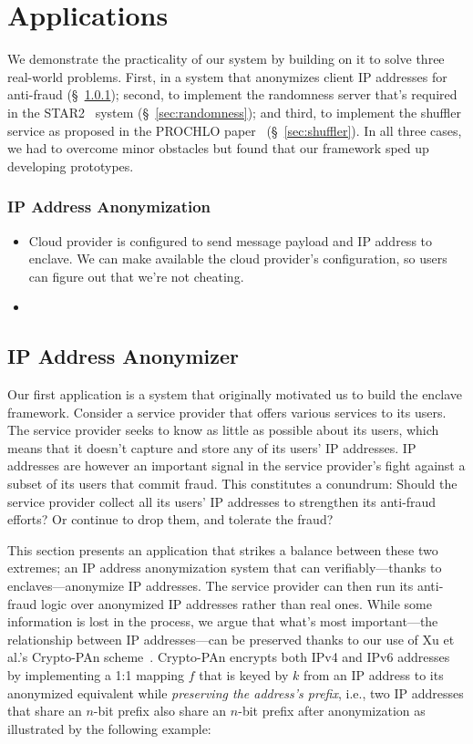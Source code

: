 \section{Applications}
\label{sec:applications}

We demonstrate the practicality of our system by building on it to solve three real-world problems.  First, in a system that anonymizes client IP addresses for anti-fraud (\S~\ref{sec:anonymization}); second, to implement the randomness server that's required in the STAR2~\cite{Davidson2021a} system (\S~\ref{sec:randomness}); and third, to implement the shuffler service as proposed in the PROCHLO paper~\cite{Bittau2017a} (\S~\ref{sec:shuffler}).  In all three cases, we had to overcome minor obstacles but found that our framework sped up developing prototypes.

\subsubsection{IP Address Anonymization}
\label{sec:anonymization}

\begin{itemize}
    \item Cloud provider is configured to send message payload and IP address to enclave. We can make available the cloud provider's configuration, so users can figure out that we're not cheating.
    \item 
\end{itemize}

\subsection{IP Address Anonymizer}

Our first application is a system that originally motivated us to build the enclave framework. Consider a service provider that offers various services to its users.  The service provider seeks to know as little as possible about its users, which means that it doesn't capture and store any of its users' IP addresses.  IP addresses are however an important signal in the service provider's fight against a subset of its users that commit fraud.  This constitutes a conundrum: Should the service provider collect all its users' IP addresses to strengthen its anti-fraud efforts?  Or continue to drop them, and tolerate the fraud?

This section presents an application that strikes a balance between these two extremes; an IP address anonymization system that can verifiably---thanks to enclaves---anonymize IP addresses.  The service provider can then run its anti-fraud logic over anonymized IP addresses rather than real ones.  While some information is lost in the process, we argue that what's most important---the relationship between IP addresses---can be preserved thanks to our use of Xu et al.'s Crypto-PAn scheme~\cite{Xu01a}.  Crypto-PAn encrypts both IPv4 and IPv6 addresses by implementing a 1:1 mapping $f$ that is keyed by $k$ from an IP address to its anonymized equivalent while \emph{preserving the address's prefix}, i.e., two IP addresses that share an $n$-bit prefix also share an $n$-bit prefix after anonymization as illustrated by the following example:

